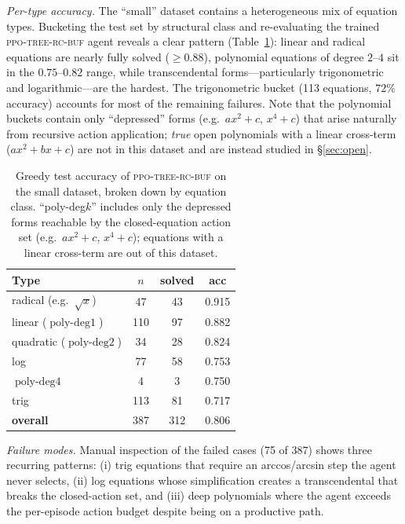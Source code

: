 \documentclass{article}
\theoremstyle{plain}
\theoremstyle{definition}
\theoremstyle{remark}
\newcommand{\op}[1]{\operatorname{#1}}
\begin{document}
\textit{Per-type accuracy.} The ``small'' dataset contains a heterogeneous mix of equation types. Bucketing the test set by structural class and re-evaluating the trained \textsc{ppo-tree-rc-buf} agent reveals a clear pattern (Table~\ref{tab:per_type}): linear and radical equations are nearly fully solved ($\geq 0.88$), polynomial equations of degree $2$--$4$ sit in the $0.75$--$0.82$ range, while transcendental forms—particularly trigonometric and logarithmic—are the hardest. The trigonometric bucket (113 equations, $72\%$ accuracy) accounts for most of the remaining failures. Note that the polynomial buckets contain only ``depressed'' forms (e.g.~$ax^2+c$, $x^4 + c$) that arise naturally from recursive action application; \emph{true} open polynomials with a linear cross-term ($ax^2+bx+c$) are not in this dataset and are instead studied in §\ref{sec:open}.

\begin{table}[h!]
\centering
\footnotesize
\caption{Greedy test accuracy of \textsc{ppo-tree-rc-buf} on the small dataset, broken down by equation class. ``poly-deg$k$'' includes only the depressed forms reachable by the closed-equation action set (e.g.\ $ax^2 + c$, $x^4 + c$); equations with a linear cross-term are out of this dataset.}
\label{tab:per_type}
\begin{tabular}{l c c c}
\toprule
Type & $n$ & solved & acc \\
\midrule
radical (e.g.\ $\sqrt{x}$)    &  47 &  43 & 0.915 \\
linear ($\op{poly-deg1}$)     & 110 &  97 & 0.882 \\
quadratic ($\op{poly-deg2}$)  &  34 &  28 & 0.824 \\
log                            &  77 &  58 & 0.753 \\
$\op{poly-deg4}$              &   4 &   3 & 0.750 \\
trig                          & 113 &  81 & 0.717 \\
\midrule
\textbf{overall}              & 387 & 312 & 0.806 \\
\bottomrule
\end{tabular}
\end{table}


\textit{Failure modes.} Manual inspection of the failed cases (75 of 387) shows three recurring patterns: (i) trig equations that require an arccos/arcsin step the agent never selects, (ii) log equations whose simplification creates a transcendental that breaks the closed-action set, and (iii) deep polynomials where the agent exceeds the per-episode action budget despite being on a productive path.
\end{document}
